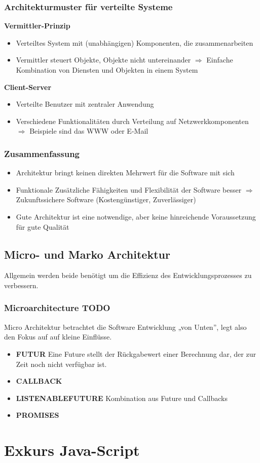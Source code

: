 \documentclass[a4paper,10pt]{scrartcl}
\begin{document}
\subsubsection{Architekturmuster für verteilte Systeme}
\textbf{Vermittler-Prinzip}

\begin{itemize}
    \item Verteiltes System mit (unabhängigen) Komponenten, die zusammenarbeiten 
    \item Vermittler steuert Objekte, Objekte nicht untereinander\newline
    $\Rightarrow$ Einfache Kombination von Diensten und Objekten in einem System
\end{itemize}
\textbf{Client-Server}
\begin{itemize}
    \item Verteilte Benutzer mit zentraler Anwendung 
    \item Verschiedene Funktionalitäten durch Verteilung auf Netzwerkkomponenten\newline
    $\Rightarrow$ Beispiele sind das WWW oder E-Mail 
\end{itemize}
\subsubsection{Zusammenfassung}
\begin{itemize}
    \item Architektur bringt keinen direkten Mehrwert für die Software mit sich
    \item Funktionale Zusätzliche Fähigkeiten und Flexibilität der Software besser\newline
    $\Rightarrow$ Zukunftssichere Software (Kostengünstiger, Zuverlässiger)
    \item Gute Architektur ist eine notwendige, aber keine hinreichende Voraussetzung für gute Qualität
\end{itemize}
\subsection{Micro- und Marko Architektur}
Allgemein werden beide benötigt um die Effizienz des Entwicklungsprozesses zu verbessern.
\subsubsection{Microarchitecture TODO}
Micro Architektur betrachtet die Software Entwicklung „von Unten”, legt also den Fokus auf auf
kleine Einflüsse.
\begin{itemize}
    \item \textbf{FUTUR} Eine Future stellt der Rückgabewert einer Berechnung dar, der zur Zeit noch nicht verfügbar ist.
    \item \textbf{CALLBACK}
    \item \textbf{LISTENABLEFUTURE}  Kombination aus Future und Callbacks
    \item \textbf{PROMISES}
\end{itemize}
\subsubsection{}

\section{Exkurs Java-Script}
\end{document}
